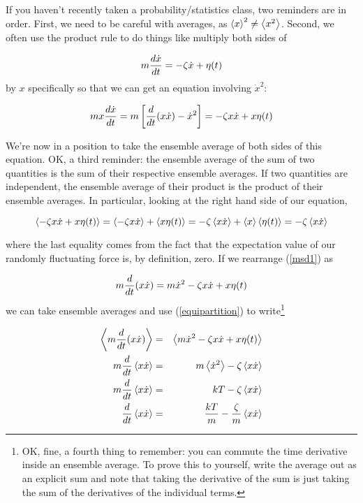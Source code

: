 \documentclass[12pt]{article}
\begin{document}
If you haven't recently taken a probability/statistics class, two
reminders are in order. First, we need to be careful with averages, as
$\left< x\right>^2 \neq \left< x^2\right>$. Second, we often use the product rule to
do things like multiply both sides of

\begin{equation}
  m\frac{d \dot{x}}{d t} = -\zeta\dot{x} + \eta(t)
\end{equation}
by $x$ specifically so that we can get an equation involving
$\dot{x}^2$:

\begin{equation}
  \label{msd1}
  mx\frac{d \dot{x}}{d t}
  =  
  m\left[ \frac{d }{d t}(x\dot{x}) - \dot{x}^2 \right] 
  = 
  -\zeta x\dot{x} + x\eta(t)
\end{equation}

We're now in a position to take the ensemble average of both sides of
this equation. OK, a third reminder: the ensemble average of the sum
of two quantities is the sum of their respective ensemble averages. If
two quantities are independent, the ensemble average of their product
is the product of their ensemble averages. In particular, looking at
the right hand side of our equation,

\begin{equation}
  \left< -\zeta x\dot{x} + x\eta(t)\right> = \left< -\zeta x\dot{x}\right> + \left< x\eta(t)\right>
  = -\zeta \left< x\dot{x}\right> + \left< x\right>\left< \eta(t)\right>
  = -\zeta \left< x\dot{x}\right>
\end{equation}

where the last equality comes from the fact that the expectation value
of our randomly fluctuating force is, by definition, zero. If we
rearrange (\ref{msd1}) as

\begin{equation}
  \label{msd2}
  m\frac{d }{d t}(x\dot{x})
  = 
  m\dot{x}^2 -\zeta x\dot{x} + x\eta(t)
\end{equation}
we can take ensemble averages and use (\ref{equipartition}) to
write\footnote{OK, fine, a fourth thing to remember: you can commute
  the time derivative inside an ensemble average. To prove this to
  yourself, write the average out as an explicit sum and note that
  taking the derivative of the sum is just taking the sum of the
  derivatives of the individual terms.}

\begin{eqnarray}
  \left< m\frac{d }{d t}(x\dot{x})\right>
  &=&
  \left< m\dot{x}^2 -\zeta x\dot{x} + x\eta(t)\right> \\
  \nonumber
  m\frac{d }{d t}\left< x\dot{x}\right>
  &=&
  m\left< \dot{x}^2\right> -\zeta \left< x\dot{x}\right> \\
  \nonumber
  m\frac{d }{d t}\left< x\dot{x}\right>
  &=&
  kT -\zeta \left< x\dot{x}\right>\\
  \label{msd3}
  \frac{d }{d t}\left< x\dot{x}\right>
  &=&
  \frac{kT}{m} -\frac{\zeta}{m} \left< x\dot{x}\right>
\end{eqnarray}
\end{document}
